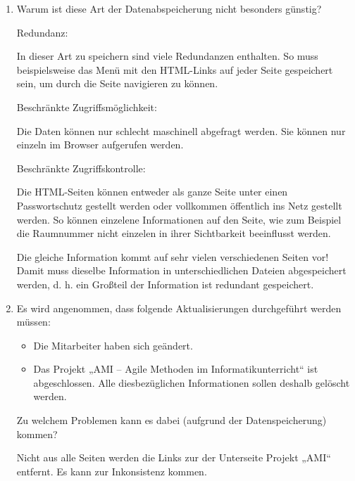 \documentclass{lehramt-informatik}
\begin{document}
\begin{enumerate}


\item Warum ist diese Art der Datenabspeicherung nicht besonders
günstig?

\begin{antwort}
Redundanz:

In dieser Art zu speichern sind viele Redundanzen enthalten. So muss
beispielsweise das Menü mit den HTML-Links auf jeder Seite gespeichert
sein, um durch die Seite navigieren zu können.

Beschränkte Zugriffsmöglichkeit:

Die Daten können nur
schlecht maschinell abgefragt werden. Sie können nur einzeln im Browser
aufgerufen werden.

Beschränkte Zugriffskontrolle:

Die HTML-Seiten können entweder als ganze Seite unter einen
Passwortschutz gestellt werden oder vollkommen öffentlich ins Netz
gestellt werden. So können einzelene Informationen auf den Seite, wie
zum Beispiel die Raumnummer nicht einzelen in ihrer Sichtbarkeit
beeinflusst werden.
\end{antwort}

\begin{antwort}[muster]
Die gleiche Information kommt auf sehr vielen verschiedenen Seiten vor!
Damit muss dieselbe Information in unterschiedlichen Dateien
abgespeichert werden, d. h. ein Großteil der Information ist redundant
gespeichert.
\end{antwort}


\item Es wird angenommen, dass folgende Aktualisierungen durchgeführt
werden müssen:

\begin{itemize}
\item Die Mitarbeiter haben sich geändert.
\item Das Projekt „AMI – Agile Methoden im Informatikunterricht“ ist
abgeschlossen. Alle diesbezüglichen Informationen sollen deshalb
gelöscht werden.
\end{itemize}

Zu welchem Problemen kann es dabei (aufgrund der Datenspeicherung)
kommen?

\begin{antwort}
Nicht aus alle Seiten werden die Links zur der Unterseite Projekt „AMI“
entfernt. Es kann zur Inkonsistenz kommen.
\end{antwort}


\end{enumerate}
\end{document}
